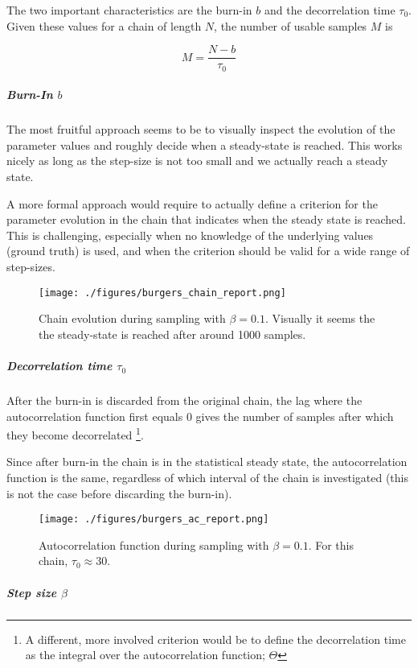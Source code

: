 \documentclass[11pt]{article}
\begin{document}
The two important characteristics are the burn-in \(b\) and the decorrelation time \(\tau_0\).
Given these values for a chain of length \(N\), the number of usable samples \(M\) is

$$ M = \frac{N - b}{\tau_0} $$ 

\subparagraph{Burn-In \(b\)}
\label{sec:org774207a}

The most fruitful approach seems to be to visually inspect the evolution of the
parameter values and roughly decide when a steady-state is reached. This works nicely
as long as the step-size is not too small and we actually reach a steady state.

A more formal approach would require to actually define a criterion for the parameter
evolution in the chain that indicates when the steady state is reached. This is challenging,
especially when no knowledge of the underlying values (ground truth) is used, and when
the criterion should be valid for a wide range of step-sizes.

\begin{figure}[htbp]
\centering
\texttt{[image: ./figures/burgers\_chain\_report.png]}
\caption{\label{fig:burgers_burn-in}
Chain evolution during sampling with \(\beta=0.1\). Visually it seems the the steady-state is reached after around 1000 samples.}
\end{figure}

\subparagraph{Decorrelation time \(\tau_0\)}
\label{sec:orgeb1e28a}

After the burn-in is discarded from the original chain, the lag where the autocorrelation
function first equals 0 gives the number of samples after which they become decorrelated
\footnote{A different, more involved criterion would be to define the decorrelation time
as the integral over the autocorrelation function; \(\Theta\)}.

Since after burn-in the chain is in the statistical steady state, the autocorrelation
function is the same, regardless of which interval of the chain is investigated (this
is not the case before discarding the burn-in).

\begin{figure}[htbp]
\centering
\texttt{[image: ./figures/burgers\_ac\_report.png]}
\caption{\label{fig:burgers_decorr_time}
Autocorrelation function during sampling with \(\beta=0.1\). For this chain, \(\tau_0 \approx 30\).}
\end{figure}

\subparagraph{Step size \(\beta\)}
\label{sec:orgdb01652}
\end{document}
